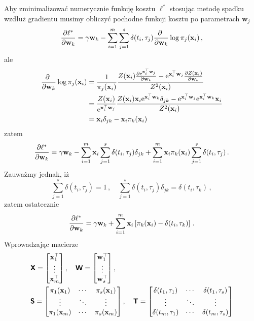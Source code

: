 \documentclass{myclass}
\begin{document}
Aby zminimalizować numerycznie funkcję kosztu \(\ell^*\) stosując metodę spadku wzdłuż gradientu
musimy obliczyć pochodne funkcji kosztu po parametrach \(\mathbf{w}_j\)
\begin{equation*}
    \pdv{\ell^*}{\mathbf{w}_k} = \gamma\mathbf{w}_k - \sum_{i=1}^m\sum_{j=1}^s \delta(t_i,\tau_j)\pdv{~}{\mathbf{w}_k}\log\pi_j(\mathbf{x}_i)\,,
\end{equation*}
ale
\begin{equation*}
    \begin{split}
        \pdv{~}{\mathbf{w}_k}\log\pi_j(\mathbf{x}_i) &= \frac{1}{\pi_j(\mathbf{x}_i)}\frac{Z(\mathbf{x}_i)\pdv{\mathrm{e}^{\mathbf{x}_i^\top\mathbf{w}_j}}{\mathbf{w}_k} - \mathrm{e}^{\mathbf{x}_i^\top\mathbf{w}_j}\pdv{Z(\mathbf{x}_i)}{\mathbf{w}_k}}{Z^2(\mathbf{x}_i)}\\
        &= \frac{Z(\mathbf{x}_i)}{\mathrm{e}^{\mathbf{x}_i^\top\mathbf{w}_j}}\frac{Z(\mathbf{x}_i)\mathbf{x}_i\mathrm{e}^{\mathbf{x}_i^\top\mathbf{w}_k}\delta_{jk} - \mathrm{e}^{\mathbf{x}_i^\top\mathbf{w}_j}\mathrm{e}^{\mathbf{x}_i^\top\mathbf{w}_k}\mathbf{x}_i}{Z^2(\mathbf{x}_i)}\\
        &= \mathbf{x}_i\delta_{jk} - \mathbf{x}_i\pi_k(\mathbf{x}_i)
    \end{split}
\end{equation*}
zatem
\begin{equation*}
    \pdv{\ell^*}{\mathbf{w}_k} = \gamma\mathbf{w}_k - \sum_{i=1}^m\mathbf{x}_i\sum_{j=1}^s \delta(t_i, \tau_j)\delta_{jk} + \sum_{i=1}^m\mathbf{x}_i\pi_k(\mathbf{x}_i)\sum_{j=1}^s\delta(t_i, \tau_j)\,.
\end{equation*}
Zauważmy jednak, iż
\begin{equation*}
    \sum_{j=1}^s\delta(t_i, \tau_j) = 1\,,\quad \sum_{j=1}^s \delta(t_i, \tau_j)\delta_{jk} = \delta(t_i, \tau_k)\,,
\end{equation*}
zatem ostatecznie
\begin{equation*}
    \pdv{\ell^*}{\mathbf{w}_k} = \gamma\mathbf{w}_k + \sum_{i=1}^m \mathbf{x}_i\left[\pi_k(\mathbf{x}_i) - \delta(t_i, \tau_k)\right]\,.
\end{equation*}
Wprowadzając macierze
\begin{equation*}
    \begin{split}
        &\oper{X} = \mqty[\mathbf{x}_1^\top \\ \vdots \\ \mathbf{x}_m^\top]\,,\quad \oper{W} = \mqty[\mathbf{w}_1^\top \\ \vdots \\ \mathbf{w}_s^\top]\,,\\
        &\oper{S} = \mqty[\pi_1(\mathbf{x}_1) & \cdots & \pi_s(\mathbf{x}_1) \\ \vdots & \ddots & \vdots \\ \pi_1(\mathbf{x}_m) & \cdots & \pi_s(\mathbf{x}_m)]\,,\quad \oper{T} = \mqty[\delta(t_1,\tau_1) & \cdots & \delta(t_1,\tau_s) \\ \vdots & \ddots & \vdots \\ \delta(t_m, \tau_1) & \cdots & \delta(t_m, \tau_s)]
    \end{split}
\end{equation*}
\end{document}
